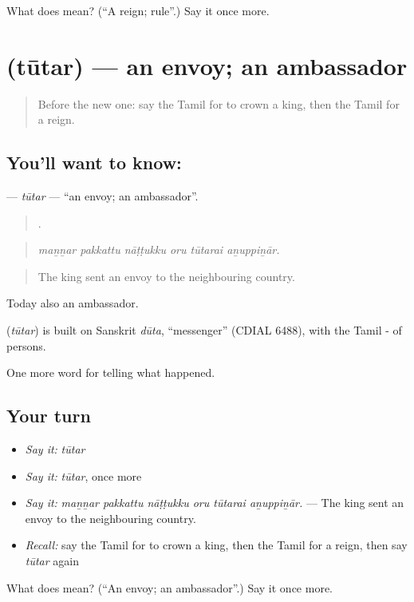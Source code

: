 \begin{tcolorbox}[breakable,colback=teal!4,colframe=teal!35!black,title={Before you move on}]
What does  mean? (\textquotedblleft{}A reign; rule\textquotedblright{}.) Say it once more.
\end{tcolorbox}
\section[\texorpdfstring{\ta{தூதர்} (tūtar)}{தூதர் (tūtar)}]{ (tūtar) — an envoy; an ambassador}

\label{lesson:TA-C329-tutar}



\begin{quote}
Before the new one: say the Tamil for to crown a king, then the Tamil for a reign.
\end{quote}

\subsection*{You'll want to know: }
\textbf{} — \emph{tūtar} — \textquotedblleft{}an envoy; an ambassador\textquotedblright{}.

\begin{quote}
     .
\end{quote}

\begin{quote}
\emph{maṉṉar pakkattu nāṭṭukku oru tūtarai aṉuppiṉār.}
\end{quote}

\begin{quote}
The king sent an envoy to the neighbouring country.
\end{quote}

Today also an ambassador.

\begin{cousinweb}
\textbf{} (\emph{tūtar}) is built on Sanskrit \emph{dūta}, \textquotedblleft{}messenger\textquotedblright{} (CDIAL 6488), with the Tamil - of persons.
\end{cousinweb}

\begin{grammarlens}[title={What you've built}]
One more word for telling what happened.
\end{grammarlens}

\subsection*{Your turn}
\begin{itemize}
\raggedright
  \item \emph{Say it:} \emph{tūtar}
  \item \emph{Say it:} \emph{tūtar}, once more
  \item \emph{Say it:} \emph{maṉṉar pakkattu nāṭṭukku oru tūtarai aṉuppiṉār.} — The king sent an envoy to the neighbouring country.
  \item \emph{Recall:} say the Tamil for to crown a king, then the Tamil for a reign, then say \emph{tūtar} again
\end{itemize}

\begin{tcolorbox}[breakable,colback=teal!4,colframe=teal!35!black,title={Before you move on}]
What does  mean? (\textquotedblleft{}An envoy; an ambassador\textquotedblright{}.) Say it once more.
\end{tcolorbox}
